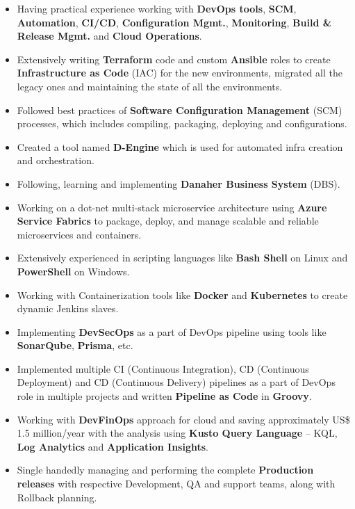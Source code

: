 \documentclass[11pt, a4paper]{article}
\begin{document}
\begin{itemize}[noitemsep, nolistsep,leftmargin=5mm,rightmargin=2mm,label=\textcolor{NavyBlue}{\textbullet}]
\item Having practical experience working with \textbf{DevOps tools}, \textbf{SCM}, \textbf{Automation}, \textbf{CI/CD}, \textbf{Configuration Mgmt.}, \textbf{Monitoring}, \textbf{Build \& Release Mgmt. }and \textbf{Cloud Operations}.
\item Extensively writing \textbf{Terraform} code and custom \textbf{Ansible} roles to create \textbf{Infrastructure as Code} (IAC) for the new environments, migrated all the legacy ones and maintaining the state of all the environments.
\item Followed best practices of \textbf{Software Configuration Management} (SCM) processes, which includes compiling, packaging, deploying and configurations.
\item Created a tool named \textbf{D-Engine} which is used for automated infra creation and orchestration.
\item Following, learning and implementing \textbf{Danaher Business System} (DBS).
\item Working on a dot-net multi-stack microservice architecture using \textbf{Azure Service Fabrics} to package, deploy, and manage scalable and reliable microservices and containers.
\item Extensively experienced in scripting languages like \textbf{Bash Shell} on Linux and \textbf{PowerShell} on Windows.
\item Working with Containerization tools like \textbf{Docker} and \textbf{Kubernetes} to create dynamic Jenkins slaves.
\item Implementing \textbf{DevSecOps} as a part of DevOps pipeline using tools like \textbf{SonarQube}, \textbf{Prisma}, etc.
\item Implemented multiple CI (Continuous Integration), CD (Continuous Deployment) and CD (Continuous Delivery) pipelines as a part of DevOps role in multiple projects and written \textbf{Pipeline as Code} in \textbf{Groovy}.
\item Working with \textbf{DevFinOps} approach for cloud and saving  approximately US\$ 1.5 million/year with the analysis using \textbf{Kusto Query Language} – KQL, \textbf{Log Analytics} and \textbf{Application Insights}.
\item Single handedly managing and performing the complete \textbf{Production releases} with respective Development, QA and support teams, along with Rollback planning.

\end{itemize}
\end{document}
